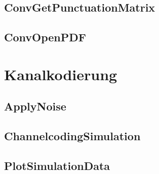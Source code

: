 \subsection{ConvGetPunctuationMatrix}


\subsection{ConvOpenPDF}
\label{kapitel:interface_ConvOpenPDF}


\section{Kanalkodierung}
\label{kapitel:interface_kanalkodierung}

\subsection{ApplyNoise}


\subsection{ChannelcodingSimulation}


\subsection{PlotSimulationData}
